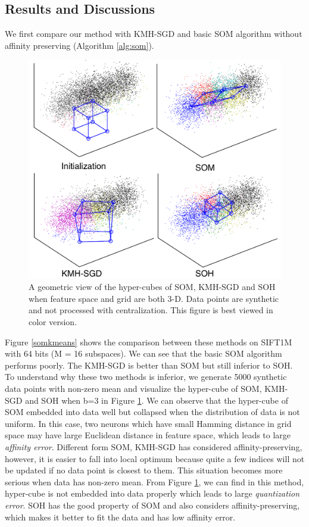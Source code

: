 \documentclass{article}
\begin{document}
\subsection{Results and Discussions}
We first compare our method with  KMH-SGD and basic SOM algorithm without affinity preserving (Algorithm \ref{alg:som}).
\begin{figure}[t]
	\begin{center}
		\includegraphics[width=0.76\columnwidth]{SOHvsOnlineKMS}
		\caption{A geometric view of the hyper-cubes of SOM, KMH-SGD and SOH when feature space and grid are both 3-D. Data points are synthetic and not processed with centralization. This figure is best viewed in color version.}
		\label{somall_2}
	\end{center}
\end{figure}
Figure \ref{somkmeans} shows the comparison between these methods on SIFT1M with 64 bits (M = 16 subspaces). We can see  that the basic SOM algorithm performs poorly. The KMH-SGD is better than SOM but still inferior to SOH.
To understand why these two methods is inferior,
we generate 5000 synthetic data points with non-zero mean and visualize the hyper-cube of SOM, KMH-SGD and SOH when b=3 in Figure \ref{somall_2}.
We can observe that the hyper-cube of SOM embedded into data well but collapsed when the distribution of data is not uniform. In this case, two neurons which have small Hamming distance in grid space may have large Euclidean distance in feature space, which leads to large \emph{affinity error}.
Different form SOM, KMH-SGD has considered  affinity-preserving, however, it is easier to fall into local optimum because quite a few indices will not be updated if no data point is closest to them. This situation becomes more serious when data has non-zero mean. From Figure \ref{somall_2}, we can find in this method, hyper-cube is not embedded  into  data  properly which leads to large \emph{quantization error}.
SOH has the good property of SOM and also considers affinity-preserving,  which makes it better to fit the data and has low affinity error.
\end{document}
